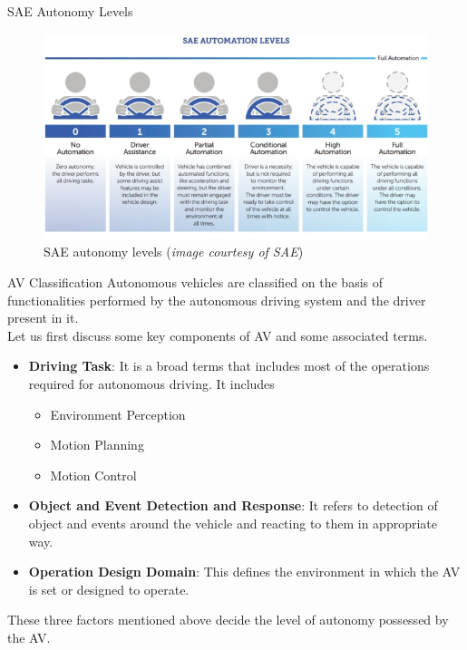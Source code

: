 \documentclass{beamer}
\begin{document}
\begin{frame}{SAE Autonomy Levels}
	\begin{figure}
		\centering
		\includegraphics[width = \textwidth]{figures/SAE levels image coutsey_SAE}
		\caption{SAE autonomy levels (\textit{image courtesy of SAE})}
		\label{saelevels}
	\end{figure}
\end{frame}

\begin{frame}{AV Classification}
Autonomous vehicles are classified on the basis of functionalities performed by the autonomous driving system and the driver present in it.\\
Let us first discuss some key components of AV and some associated terms.

\begin{itemize}
    \item \textbf{Driving Task}: It is a broad terms that includes most of the operations required for autonomous driving. It includes
    \begin{itemize}
        \item Environment Perception
        \item Motion Planning
        \item Motion Control
    \end{itemize}
    \item \textbf{Object and Event Detection and Response}: It refers to detection of object and events around the vehicle and reacting to them in appropriate way.
    
    \item \textbf{Operation Design Domain}: This defines the environment in which the AV is set or designed to operate.
    
\end{itemize}
    These three factors mentioned above decide the level of autonomy possessed by the AV.
\end{frame}
\end{document}
